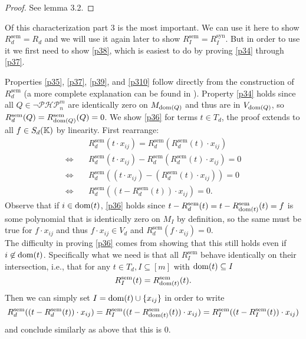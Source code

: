 \documentclass{article}
\newcommand{\PHP}{\ensuremath{\neg \mathcal{PHP}^m_n}\xspace}
\newcommand{\Rsem}{R^\mathrm{sem}}
\newcommand{\Rsyn}{R^\mathrm{syn}}
\begin{document}
\begin{proof}
    See \cite{raz} lemma 3.2.
\end{proof}
Of this characterization part 3 is the most important. We can use it here to show $\Rsem_d = R_d$ and we will use it again later to show $\Rsem_I = \Rsyn_I$. But in order to use it we first need to show \eqref{p38}, which is easiest to do by proving \eqref{p34} through \eqref{p37}.

Properties \eqref{p35}, \eqref{p37}, \eqref{p39}, and \eqref{p310} follow directly from the construction of $\Rsem_d$ (a more complete explanation can be found in \cite{raz}). Property \eqref{p34} holds since all $Q \in \PHP$ are identically zero on $M_{\operatorname{dom}(Q)}$ and thus are in $V_{\operatorname{dom}(Q)}$, so $\Rsem_d(Q) = \Rsem_{\dom(Q)}(Q) = 0$. We show \eqref{p36} for terms $t \in T_d$, the proof extends to all $f \in S_d(\mathbb{K})$ by linearity. First rearrange:
\begin{align*}
    &\Rsem_d(t \cdot x_{ij}) = \Rsem_d(\Rsem_d(t) \cdot x_{ij})\\
    \Leftrightarrow \quad &\Rsem_d(t \cdot x_{ij}) - \Rsem_d(\Rsem_d(t) \cdot x_{ij}) = 0\\
    \Leftrightarrow \quad &\Rsem_d((t \cdot x_{ij}) - (\Rsem_d(t) \cdot x_{ij})) = 0\\
    \Leftrightarrow \quad &\Rsem_d((t - \Rsem_d(t)) \cdot x_{ij}) = 0.
\end{align*}
Observe that if $i \in \operatorname{dom}(t)$, \eqref{p36} holds since $t - \Rsem_d(t) = t - \Rsem_{\dom(t)}(t) = f$ is some polynomial that is identically zero on $M_I$ by definition, so the same must be true for $f \cdot x_{ij}$ and thus $f \cdot x_{ij} \in V_d$ and $\Rsem_d(f \cdot x_{ij}) = 0$.\\
The difficulty in proving \eqref{p36} comes from showing that this still holds even if $i \not\in \operatorname{dom}(t)$. Specifically what we need is that all $\Rsem_I$ behave identically on their intersection, i.e., that for any $t \in T_d, I \subseteq [m]$ with $\operatorname{dom}(t) \subseteq I$
\begin{equation}
    \Rsem_I(t) = \Rsem_{\dom(t)}(t). \label{inteq}
\end{equation}
Then we can simply set $I = \operatorname{dom}(t) \cup \{x_{ij}\}$ in order to write
\begin{equation*}
    \Rsem_d((t - \Rsem_d(t)) \cdot x_{ij}) = \Rsem_I((t - \Rsem_{\dom(t)}(t)) \cdot x_{ij}) = \Rsem_I((t - \Rsem_I(t)) \cdot x_{ij})
\end{equation*}
and conclude similarly as above that this is $0$.
\end{document}
